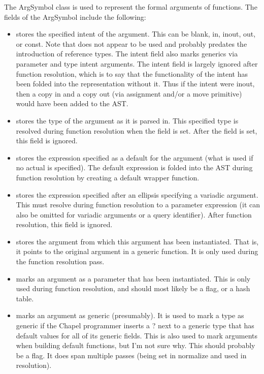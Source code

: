 \documentclass[10pt]{article}
\begin{document}
The ArgSymbol class is used to represent the formal arguments of
functions.  The fields of the ArgSymbol include the following:
\begin{itemize}
\item {} stores the specified intent of the
  argument.  This can be blank, in, inout, out, or const.  Note that
   does not appear to be used and probably predates the
  introduction of reference types.  The intent field also marks
  generics via parameter and type intent arguments.  The intent field
  is largely ignored after function resolution, which is to say that
  the functionality of the intent has been folded into the
  representation without it.  Thus if the intent were inout, then a
  copy in and a copy out (via assignment and/or a move primitive)
  would have been added to the AST.
\item {} stores the type of the argument as it
  is parsed in.  This specified type is resolved during function
  resolution when the  field is set.  After the 
  field is set, this field is ignored.
\item {} stores the expression specified as a
  default for the argument (what is used if no actual is specified).
  The default expression is folded into the AST during function
  resolution by creating a default wrapper function.
\item {} stores the expression specified
  after an ellipsis specifying a variadic argument.  This must resolve
  during function resolution to a parameter expression (it can also be
  omitted for variadic arguments or a query identifier).  After
  function resolution, this field is ignored.
\item {} stores the argument from which this
  argument has been instantiated.  That is, it points to the original
  argument in a generic function.  It is only used during the function
  resolution pass.
\item {} marks an argument as a parameter
  that has been instantiated.  This is only used during function
  resolution, and should most likely be a flag, or a hash table.
\item {} marks an argument as generic
  (presumably).  It is used to mark a type as generic if the Chapel
  programmer inserts a ? next to a generic type that has default
  values for all of its generic fields.  This is also used to mark
  arguments when building default functions, but I'm not sure why.
  This should probably be a flag.  It does span multiple passes (being
  set in normalize and used in resolution).
\end{itemize}
\end{document}
